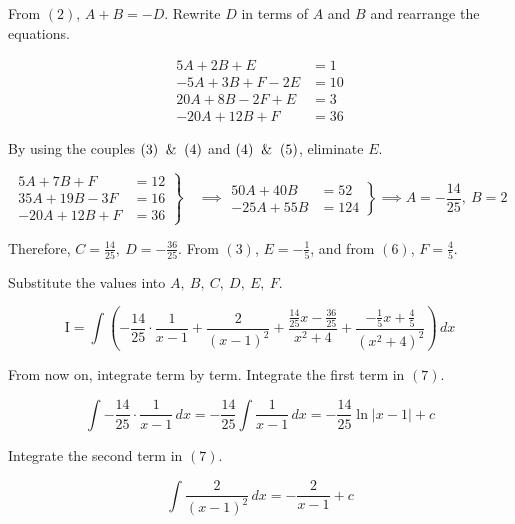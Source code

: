 \documentclass{article}
\begin{document}
\noindent From $(2)$, $A+B=-D$. Rewrite $D$ in terms of $A$ and $B$ and rearrange the equations.

\begin{align}
5A+2B+E&=1\\
-5A+3B+F-2E&=10\\
20A+8B-2F+E&=3\\
-20A+12B+F&=36
\end{align}

\noindent By using the couples $(3)\And(4)$ and $(4)\And(5)$, eliminate $E$.

\[\left.\begin{array}{rl}
5A+7B+F&=12\\
35A+19B-3F&=16\\
-20A+12B+F&=36
\end{array}\right\}\quad\implies\left.\begin{array}{rl}
50A+40B&=52\\
-25A+55B&=124
\end{array}\right\}\implies A=-\frac{14}{25},\:B=2
\]

\hfill

\noindent Therefore, $\displaystyle C=\frac{14}{25},\:D=-\frac{36}{25}$. From $(3)$, $\displaystyle E=-\frac15$, and from $(6)$, $\displaystyle F=\frac45$.

\hfill

\noindent Substitute the values into $A,\:B,\:C,\:D,\:E,\:F$.

\begin{equation}\mathrm{I}=\int\left(-\frac{14}{25}\cdot\frac1{x-1}+\frac2{(x-1)^2}+\frac{\frac{14}{25}x-\frac{36}{25}}{x^2+4}+\frac{-\frac15x+\frac45}{\left(x^2+4\right)^2}\right)\,dx\end{equation}

\hfill

\noindent From now on, integrate term by term. Integrate the first term in $(7)$.

\hfill

\begin{equation}\int-\frac{14}{25}\cdot\frac1{x-1}\,dx=-\frac{14}{25}\int\frac1{x-1}\,dx=-\frac{14}{25}\ln\left|x-1\right|+c\end{equation}

\hfill

\noindent Integrate the second term in $(7)$.

\hfill

\begin{equation}\int\frac{2}{(x-1)^2}\,dx=-\frac2{x-1}+c\end{equation}
\end{document}
